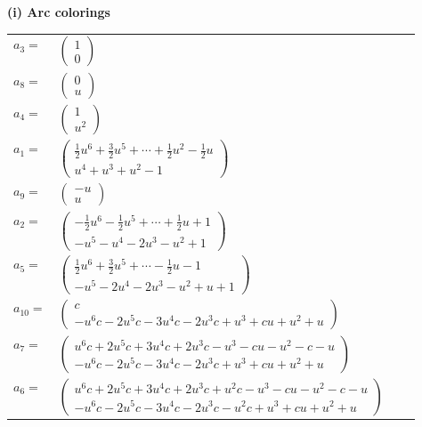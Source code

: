 \documentclass[1p]{elsarticle_modified}
\theoremstyle{definition}
\begin{document}
\flushleft \textbf{(i) Arc colorings}\\
\begin{tabular}{m{7pt} m{180pt} m{7pt} m{180pt} }
\flushright $a_{3}=$&$\begin{pmatrix}1\\0\end{pmatrix}$ \\
\flushright $a_{8}=$&$\begin{pmatrix}0\\u\end{pmatrix}$ \\
\flushright $a_{4}=$&$\begin{pmatrix}1\\u^2\end{pmatrix}$ \\
\flushright $a_{1}=$&$\begin{pmatrix}\frac{1}{2} u^6+\frac{3}{2} u^5+\cdots+\frac{1}{2} u^2-\frac{1}{2} u\\u^4+u^3+u^2-1\end{pmatrix}$ \\
\flushright $a_{9}=$&$\begin{pmatrix}- u\\u\end{pmatrix}$ \\
\flushright $a_{2}=$&$\begin{pmatrix}-\frac{1}{2} u^6-\frac{1}{2} u^5+\cdots+\frac{1}{2} u+1\\- u^5- u^4-2 u^3- u^2+1\end{pmatrix}$ \\
\flushright $a_{5}=$&$\begin{pmatrix}\frac{1}{2} u^6+\frac{3}{2} u^5+\cdots-\frac{1}{2} u-1\\- u^5-2 u^4-2 u^3- u^2+u+1\end{pmatrix}$ \\
\flushright $a_{10}=$&$\begin{pmatrix}c\\- u^6 c-2 u^5 c-3 u^4 c-2 u^3 c+u^3+c u+u^2+u\end{pmatrix}$ \\
\flushright $a_{7}=$&$\begin{pmatrix}u^6 c+2 u^5 c+3 u^4 c+2 u^3 c- u^3- c u- u^2- c- u\\- u^6 c-2 u^5 c-3 u^4 c-2 u^3 c+u^3+c u+u^2+u\end{pmatrix}$ \\
\flushright $a_{6}=$&$\begin{pmatrix}u^6 c+2 u^5 c+3 u^4 c+2 u^3 c+u^2 c- u^3- c u- u^2- c- u\\- u^6 c-2 u^5 c-3 u^4 c-2 u^3 c- u^2 c+u^3+c u+u^2+u\end{pmatrix}$ \\

\end{tabular}
\end{document}
